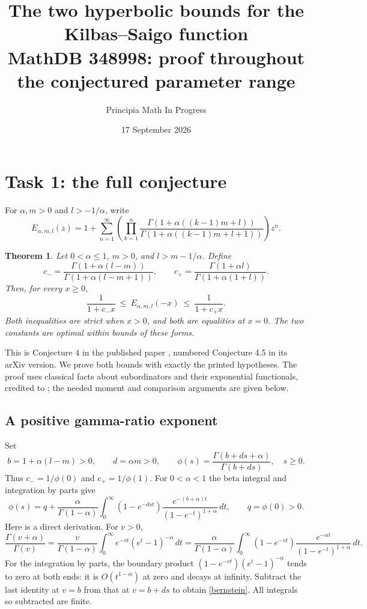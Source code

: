 \documentclass[11pt]{article}
\title{The two hyperbolic bounds for the Kilbas--Saigo function\\
\large MathDB 348998: proof throughout the conjectured parameter range}
\author{Principia Math In Progress}
\date{17 September 2026}
\newtheorem{theorem}{Theorem}
\begin{document}
\maketitle

\section*{Task 1: the full conjecture}
For $\alpha,m>0$ and $l>-1/\alpha$, write
\begin{equation}\label{definition}
 E_{\alpha,m,l}(z)=1+\sum_{n=1}^\infty
 \left(\prod_{k=1}^n
 \frac{\Gamma(1+\alpha((k-1)m+l))}
      {\Gamma(1+\alpha((k-1)m+l+1))}\right)z^n.
\end{equation}

\begin{theorem}\label{main}
Let $0<\alpha\leq1$, $m>0$, and $l>m-1/\alpha$. Define
\[
 c_- =\frac{\Gamma(1+\alpha(l-m))}
                 {\Gamma(1+\alpha(l-m+1))},
 \qquad
 c_+ =\frac{\Gamma(1+\alpha l)}
                 {\Gamma(1+\alpha(1+l))}.
\]
Then, for every $x\geq0$,
\begin{equation}\label{bounds}
 \boxed{\displaystyle
 \frac1{1+c_-x}\ \leq\ E_{\alpha,m,l}(-x)\ \leq\ \frac1{1+c_+x}.}
\end{equation}
Both inequalities are strict when $x>0$, and both are equalities at
$x=0$. The two constants are optimal within bounds of these forms.
\end{theorem}

This is Conjecture 4 in the published paper \cite{BS}, numbered
Conjecture 4.5 in its arXiv version. We prove both bounds with exactly
the printed hypotheses. The proof uses classical facts about
subordinators and their exponential functionals, credited to
\cite{BY}; the needed moment and comparison arguments are given below.

\subsection*{A positive gamma-ratio exponent}
Set
\begin{equation}\label{parameters}
 b=1+\alpha(l-m)>0,\qquad d=\alpha m>0,\qquad
 \phi(s)=\frac{\Gamma(b+ds+\alpha)}{\Gamma(b+ds)},\quad s\geq0.
\end{equation}
Thus $c_-=1/\phi(0)$ and $c_+=1/\phi(1)$.
For $0<\alpha<1$ the beta integral and integration by parts give
\begin{equation}\label{bernstein}
 \phi(s)=q+\frac{\alpha}{\Gamma(1-\alpha)}
 \int_0^\infty (1-e^{-dst})
       \frac{e^{-(b+\alpha)t}}{(1-e^{-t})^{1+\alpha}}\,dt,
 \qquad q=\phi(0)>0.
\end{equation}
Here is a direct derivation. For $v>0$,
\[
 \frac{\Gamma(v+\alpha)}{\Gamma(v)}
 =\frac{v}{\Gamma(1-\alpha)}
       \int_0^\infty e^{-vt}(e^t-1)^{-\alpha}\,dt
 =\frac{\alpha}{\Gamma(1-\alpha)}
       \int_0^\infty(1-e^{-vt})
       \frac{e^{-\alpha t}}{(1-e^{-t})^{1+\alpha}}\,dt.
\]
For the integration by parts, the boundary product
$(1-e^{-vt})(e^t-1)^{-\alpha}$ tends to zero at both ends:
it is $O(t^{1-\alpha})$ at zero and decays at infinity.
Subtract the last identity at $v=b$ from that at $v=b+ds$ to obtain
\eqref{bernstein}. All integrals so subtracted are finite.
\end{document}
